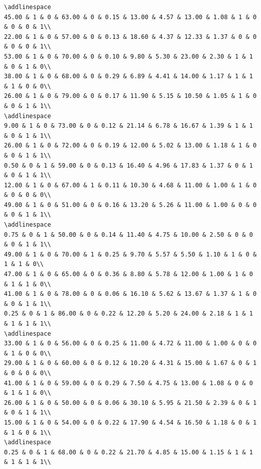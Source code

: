 \documentclass[
]{article}
\begin{document}
\begin{verbatim}
\addlinespace
45.00 & 1 & 0 & 63.00 & 0 & 0.15 & 13.00 & 4.57 & 13.00 & 1.08 & 1 & 0 & 0 & 0 & 1\\
22.00 & 1 & 0 & 57.00 & 0 & 0.13 & 18.60 & 4.37 & 12.33 & 1.37 & 0 & 0 & 0 & 0 & 1\\
53.00 & 1 & 0 & 70.00 & 0 & 0.10 & 9.80 & 5.30 & 23.00 & 2.30 & 1 & 1 & 0 & 1 & 0\\
38.00 & 1 & 0 & 68.00 & 0 & 0.29 & 6.89 & 4.41 & 14.00 & 1.17 & 1 & 1 & 1 & 0 & 0\\
26.00 & 1 & 0 & 79.00 & 0 & 0.17 & 11.90 & 5.15 & 10.50 & 1.05 & 1 & 0 & 0 & 1 & 1\\
\addlinespace
9.00 & 1 & 0 & 73.00 & 0 & 0.12 & 21.14 & 6.78 & 16.67 & 1.39 & 1 & 1 & 0 & 1 & 1\\
26.00 & 1 & 0 & 72.00 & 0 & 0.19 & 12.00 & 5.02 & 13.00 & 1.18 & 1 & 0 & 0 & 1 & 1\\
0.50 & 0 & 1 & 59.00 & 0 & 0.13 & 16.40 & 4.96 & 17.83 & 1.37 & 0 & 1 & 0 & 1 & 1\\
12.00 & 1 & 0 & 67.00 & 1 & 0.11 & 10.30 & 4.68 & 11.00 & 1.00 & 1 & 0 & 0 & 0 & 0\\
49.00 & 1 & 0 & 51.00 & 0 & 0.16 & 13.20 & 5.26 & 11.00 & 1.00 & 0 & 0 & 0 & 1 & 1\\
\addlinespace
0.75 & 0 & 1 & 50.00 & 0 & 0.14 & 11.40 & 4.75 & 10.00 & 2.50 & 0 & 0 & 0 & 1 & 1\\
49.00 & 1 & 0 & 70.00 & 1 & 0.25 & 9.70 & 5.57 & 5.50 & 1.10 & 1 & 0 & 1 & 1 & 0\\
47.00 & 1 & 0 & 65.00 & 0 & 0.36 & 8.80 & 5.78 & 12.00 & 1.00 & 1 & 0 & 1 & 1 & 0\\
41.00 & 1 & 0 & 78.00 & 0 & 0.06 & 16.10 & 5.62 & 13.67 & 1.37 & 1 & 0 & 0 & 1 & 1\\
0.25 & 0 & 1 & 86.00 & 0 & 0.22 & 12.20 & 5.20 & 24.00 & 2.18 & 1 & 1 & 1 & 1 & 1\\
\addlinespace
33.00 & 1 & 0 & 56.00 & 0 & 0.25 & 11.00 & 4.72 & 11.00 & 1.00 & 0 & 0 & 1 & 0 & 0\\
29.00 & 1 & 0 & 60.00 & 0 & 0.12 & 10.20 & 4.31 & 15.00 & 1.67 & 0 & 1 & 0 & 0 & 0\\
41.00 & 1 & 0 & 59.00 & 0 & 0.29 & 7.50 & 4.75 & 13.00 & 1.08 & 0 & 0 & 1 & 1 & 0\\
26.00 & 1 & 0 & 50.00 & 0 & 0.06 & 30.10 & 5.95 & 21.50 & 2.39 & 0 & 1 & 0 & 1 & 1\\
15.00 & 1 & 0 & 54.00 & 0 & 0.22 & 17.90 & 4.54 & 16.50 & 1.18 & 0 & 1 & 1 & 0 & 1\\
\addlinespace
0.25 & 0 & 1 & 68.00 & 0 & 0.22 & 21.70 & 4.85 & 15.00 & 1.15 & 1 & 1 & 1 & 1 & 1\\

\end{verbatim}
\end{document}
